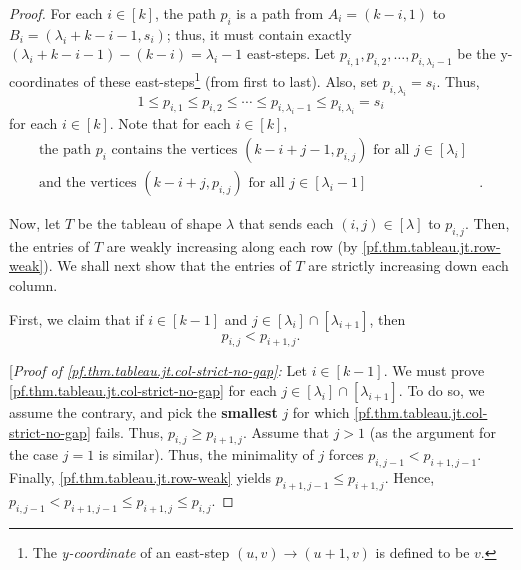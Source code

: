 \documentclass[reqno]{amsart}%
\newcommand{\0}{\phantom{c}}
\newcommand{\defn}[1]{{\color{darkred}\emph{#1}}}
\theoremstyle{plain}
\theoremstyle{definition}
\numberwithin{equation}{section}
\begin{document}
\begin{proof}
For each $i\in\left[  k\right]  $, the path $p_{i}$ is a path from
$A_{i}=\left(  k-i,1\right)  $ to $B_{i}=\left(  \lambda_{i}+k-i-1,s_{i}%
\right)  $; thus, it must contain exactly $\left(  \lambda_{i}+k-i-1\right)
-\left(  k-i\right)  =\lambda_{i}-1$ east-steps. Let $p_{i,1},p_{i,2}%
,\ldots,p_{i,\lambda_{i}-1}$ be the y-coordinates of these
east-steps\footnote{The \defn{y-coordinate} of an east-step $\left(
u,v\right)  \rightarrow\left(  u+1,v\right)  $ is defined to be $v$.} (from
first to last). Also, set $p_{i,\lambda_{i}}=s_{i}$. Thus,
\begin{equation}
1\leq p_{i,1}\leq p_{i,2}\leq\cdots\leq p_{i,\lambda_{i}-1}\leq p_{i,\lambda
_{i}}=s_{i} \label{pf.thm.tableau.jt.row-weak}%
\end{equation}
for each $i\in\left[  k\right]  $. Note that for each $i\in\left[  k\right]
$,%
\begin{align}
\text{the path }p_{i}\text{ contains the vertices }\left(  k-i+j-1,p_{i,j}%
\right)  \text{ for all }j\in\left[  \lambda_{i}\right]   &
\label{pf.thm.tableau.jt.pi-vert-1}\\
\text{and the vertices }\left(  k-i+j,p_{i,j}\right)  \text{ for all }%
j\in\left[  \lambda_{i}-1\right]   &  . \label{pf.thm.tableau.jt.pi-vert-2}%
\end{align}


Now, let $T$ be the tableau of shape $\lambda$ that sends each $\left(
i,j\right)  \in\left[  \lambda\right]  $ to $p_{i,j}$. Then, the entries of
$T$ are weakly increasing along each row (by
\eqref{pf.thm.tableau.jt.row-weak}). We shall next show that the entries of
$T$ are strictly increasing down each column.

First, we claim that if $i\in\left[  k-1\right]  $ and $j\in\left[
\lambda_{i}\right]  \cap\left[  \lambda_{i+1}\right]  $, then%
\begin{equation}
p_{i,j}<p_{i+1,j}. \label{pf.thm.tableau.jt.col-strict-no-gap}%
\end{equation}


[\textit{Proof of \eqref{pf.thm.tableau.jt.col-strict-no-gap}:} Let
$i\in\left[  k-1\right]  $. We must prove
\eqref{pf.thm.tableau.jt.col-strict-no-gap} for each $j\in\left[  \lambda
_{i}\right]  \cap\left[  \lambda_{i+1}\right]  $. To do so, we assume the
contrary, and pick the \textbf{smallest} $j$ for which
\eqref{pf.thm.tableau.jt.col-strict-no-gap} fails. Thus, $p_{i,j}\geq
p_{i+1,j}$. Assume that $j>1$ (as the argument for the case $j=1$ is similar).
Thus, the minimality of $j$ forces $p_{i,j-1}<p_{i+1,j-1}$. Finally,
\eqref{pf.thm.tableau.jt.row-weak} yields $p_{i+1,j-1}\leq p_{i+1,j}$. Hence,
$p_{i,j-1}<p_{i+1,j-1}\leq p_{i+1,j}\leq p_{i,j}$.


\end{proof}
\end{document}
